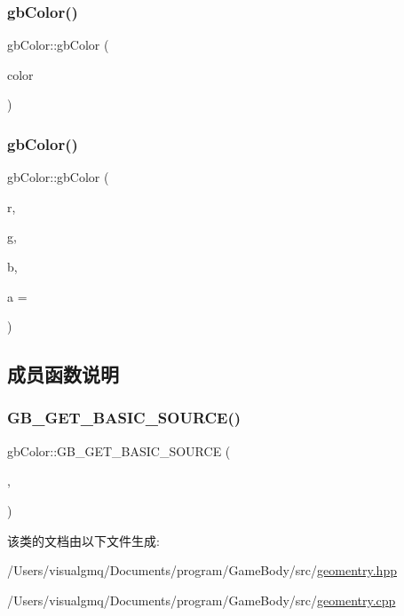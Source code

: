 \mbox{\label{classgb_color_a41c052aa6944c5e3951ad25534d13aa1}} 
\subsubsection{\texorpdfstring{gbColor()}{gbColor()}\hspace{0.1cm}{\footnotesize\ttfamily [2/3]}}
{\footnotesize\ttfamily gb\+Color\+::gb\+Color (\begin{DoxyParamCaption}\item[{S\+D\+L\+\_\+\+Color}]{color }\end{DoxyParamCaption})}

\mbox{\label{classgb_color_afd3f890cacd7ce4eb3f71aac1153d6a2}} 
\subsubsection{\texorpdfstring{gbColor()}{gbColor()}\hspace{0.1cm}{\footnotesize\ttfamily [3/3]}}
{\footnotesize\ttfamily gb\+Color\+::gb\+Color (\begin{DoxyParamCaption}\item[{int}]{r,  }\item[{int}]{g,  }\item[{int}]{b,  }\item[{int}]{a = {} }\end{DoxyParamCaption})}



\subsection{成员函数说明}
\mbox{\label{classgb_color_aa1cfdc1c48c31e1859f4a13331c72a09}} 
\subsubsection{\texorpdfstring{GB\_GET\_BASIC\_SOURCE()}{GB\_GET\_BASIC\_SOURCE()}}
{\footnotesize\ttfamily gb\+Color\+::\+G\+B\+\_\+\+G\+E\+T\+\_\+\+B\+A\+S\+I\+C\+\_\+\+S\+O\+U\+R\+CE (\begin{DoxyParamCaption}\item[{S\+D\+L\+\_\+\+Color \&}]{,  }\item[{color}]{ }\end{DoxyParamCaption})}



该类的文档由以下文件生成\+:\begin{DoxyCompactItemize}
\item 
/\+Users/visualgmq/\+Documents/program/\+Game\+Body/src/\mbox{\hyperlink{geomentry_8hpp}{geomentry.\+hpp}}\item 
/\+Users/visualgmq/\+Documents/program/\+Game\+Body/src/\mbox{\hyperlink{geomentry_8cpp}{geomentry.\+cpp}}\end{DoxyCompactItemize}
